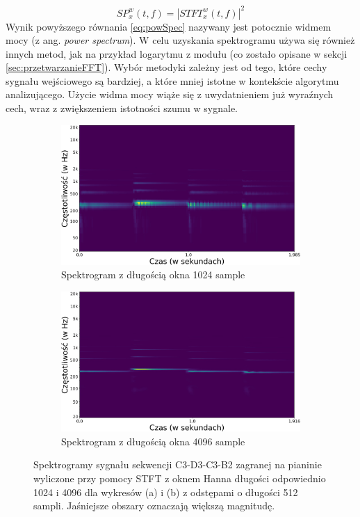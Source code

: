 \documentclass[12pt,a4paper,twoside]{mwart}
\begin{document}
\begin{equation} \label{eq:powSpec}
  SP_x^w(t,f) = |STFT_x^w(t,f)|^2
\end{equation} 
Wynik powyższego równania \ref{eq:powSpec} nazywany jest potocznie widmem mocy (z ang. \textit{power spectrum}). W celu uzyskania spektrogramu używa się również innych metod, jak na przykład logarytmu z modułu (co zostało opisane w sekcji \ref{sec:przetwarzanieFFT}). Wybór metodyki zależny jest od tego, które cechy sygnału wejściowego są bardziej, a które mniej istotne w kontekście algorytmu analizującego. Użycie widma mocy wiąże się z uwydatnieniem już wyraźnych cech, wraz z zwiększeniem istotności szumu w sygnale.

\begin{figure}[t]
  \begin{subfigure}{.49\textwidth}
    \centering
    \includegraphics[width=1.\linewidth]{images/Spectrogram/spectrogram_1024_cropped.jpg}
    \caption{Spektrogram z długością okna 1024 sample}
  \end{subfigure}
  \begin{subfigure}{.5\textwidth}
    \centering
    \includegraphics[width=1.\linewidth]{images/Spectrogram/spectrogram_4096_cropped.jpg}
    \caption{Spektrogram z długością okna 4096 sample}
  \end{subfigure}
  \caption{Spektrogramy sygnału sekwencji C3-D3-C3-B2 zagranej na pianinie wyliczone przy pomocy STFT z oknem Hanna długości odpowiednio 1024 i 4096 dla wykresów (a) i (b) z odstępami o długości 512 sampli. Jaśniejsze obszary oznaczają większą magnitudę.}
  \label{fig:windowSize}
\end{figure}
\end{document}
